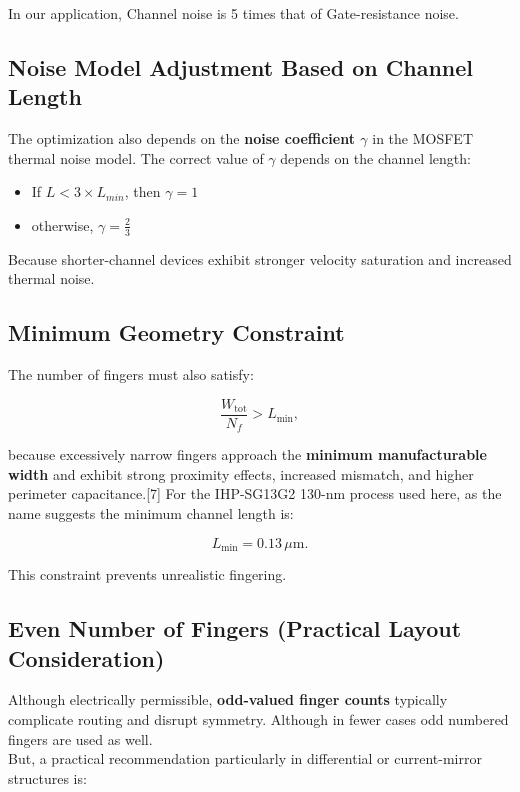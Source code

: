 \documentclass[
  11pt,
  a4paper,
  oneside]{scrbook}
\providecommand{\tightlist}{%
  \setlength{\itemsep}{0pt}\setlength{\parskip}{0pt}}
\begin{document}
In our application, Channel noise is 5 times that of Gate-resistance
noise.

\subsection{Noise Model Adjustment Based on Channel
Length}\label{noise-model-adjustment-based-on-channel-length}

The optimization also depends on the \textbf{noise coefficient
\emph{\(\gamma\)}} in the MOSFET thermal noise model. The correct value
of \(\gamma\) depends on the channel length:

\begin{itemize}
\tightlist
\item
  If \(L < 3 \times L_{min}\), then \(\gamma = 1\)\\
\item
  otherwise, \(\gamma = \frac{2}{3}\)
\end{itemize}

Because shorter-channel devices exhibit stronger velocity saturation and
increased thermal noise.

\subsection{Minimum Geometry
Constraint}\label{minimum-geometry-constraint}

The number of fingers must also satisfy:

\[
\frac{W_{\text{tot}}}{N_f} > L_{\min},
\]

because excessively narrow fingers approach the \textbf{minimum
manufacturable width} and exhibit strong proximity effects, increased
mismatch, and higher perimeter capacitance.{[}7{]} For the IHP-SG13G2
130-nm process used here, as the name suggests the minimum channel
length is:

\[
L_{\min} = 0.13\,\mu\text{m}.
\]

This constraint prevents unrealistic fingering.

\subsection{Even Number of Fingers (Practical Layout
Consideration)}\label{even-number-of-fingers-practical-layout-consideration}

Although electrically permissible, \textbf{odd-valued finger counts}
typically complicate routing and disrupt symmetry. Although in fewer
cases odd numbered fingers are used as well.\\
But, a practical recommendation particularly in differential or
current-mirror structures is:
\end{document}

